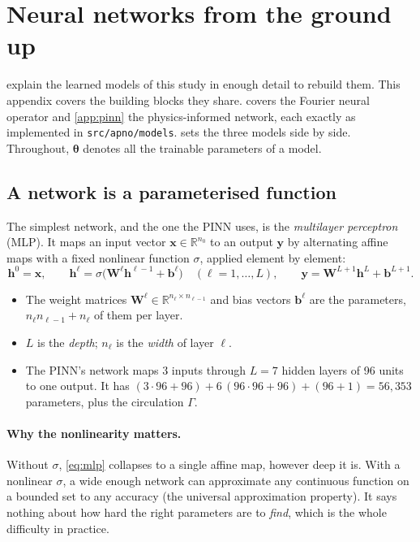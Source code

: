 
\section{Neural networks from the ground up}
\label{app:basics}

 explain the learned models of this study in enough
detail to rebuild them. This appendix covers the building blocks they share.
 covers the Fourier neural operator and \cref{app:pinn} the physics-informed network,
each exactly as implemented in \texttt{src/apno/models}.  sets the three models
side by side. Throughout, $\bm\theta$ denotes all the trainable parameters of a model.

\subsection{A network is a parameterised function}

The simplest network, and the one the PINN uses, is the \emph{multilayer perceptron} (MLP). It
maps an input vector $\bm x\in\mathbb R^{n_0}$ to an output $\bm y$ by alternating affine maps with
a fixed nonlinear function $\sigma$, applied element by element:
\begin{equation}
  \bm h^{0} = \bm x,\qquad
  \bm h^{\ell} = \sigma\!\bigl(\bm W^{\ell}\bm h^{\ell-1} + \bm b^{\ell}\bigr)\quad(\ell = 1,\dots,L),\qquad
  \bm y = \bm W^{L+1}\bm h^{L} + \bm b^{L+1}.
  \label{eq:mlp}
\end{equation}
\begin{itemize}
  \item The weight matrices $\bm W^\ell\in\mathbb R^{n_\ell\times n_{\ell-1}}$ and bias vectors
    $\bm b^\ell$ are the parameters, $n_\ell n_{\ell-1} + n_\ell$ of them per layer.
  \item $L$ is the \emph{depth}; $n_\ell$ is the \emph{width} of layer $\ell$.
  \item The PINN's network maps 3 inputs through $L = 7$ hidden layers of 96 units to one output.
    It has $(3\cdot96+96) + 6\,(96\cdot96+96) + (96+1) = 56{,}353$ parameters, plus the
    circulation $\Gamma$.
\end{itemize}

\paragraph{Why the nonlinearity matters.}
Without $\sigma$, \cref{eq:mlp} collapses to a single affine map, however deep it is. With a
nonlinear $\sigma$, a wide enough network can approximate any continuous function on a bounded set
to any accuracy (the universal approximation property). It says nothing about how hard the right
parameters are to \emph{find}, which is the whole difficulty in practice.

